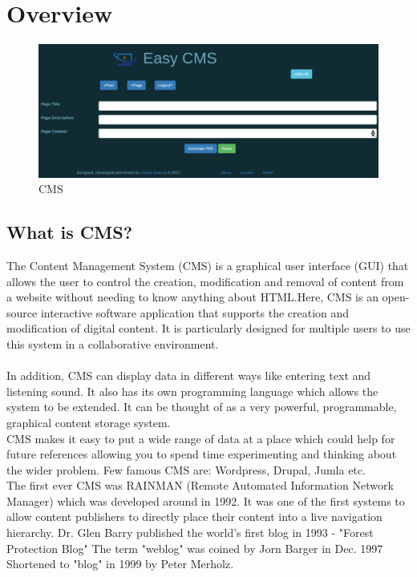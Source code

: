 \section{Overview}
\begin{figure}[!ht]
\centering
\includegraphics[scale=0.41]{input/images/mode.png}                   
\caption{CMS}
\hspace{-1.5em}
\end{figure}
\subsection{What is CMS?}
The Content Management System (CMS) is a graphical user interface (GUI) that allows the user to control the creation, modification and removal of content from a website without needing to know anything about HTML.Here, CMS is an open-source interactive software application that supports the creation and modification of digital content. It is particularly designed for multiple users to use this system in a collaborative environment. \\\\
In addition, CMS can display data in different ways like entering text and listening sound. It
also has its own programming language which allows the system to be extended. It can
be thought of as a very powerful, programmable, graphical content storage system.\\
CMS makes it easy to put a wide range of data at a place which could help for future references allowing you to spend time experimenting and thinking about the wider problem.
Few famous CMS are: Wordpress, Drupal, Jumla etc. \\
The first ever CMS was RAINMAN (Remote Automated Information Network Manager) which was developed around in 1992. It was one of the first systems to allow content publishers to directly place their content into a live navigation hierarchy.
Dr. Glen Barry published the world's first blog in 1993 - "Forest Protection Blog" The term "weblog" was coined by Jorn Barger in Dec. 1997 Shortened to "blog" in 1999 by Peter Merholz.
